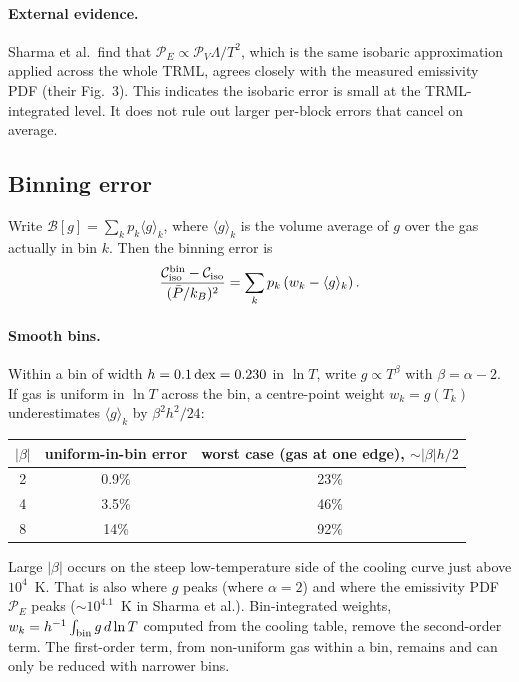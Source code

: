 \documentclass[11pt]{article}
\newcommand{\B}{\mathcal{B}}
\newcommand{\Ciso}{\mathcal{C}_{\rm iso}}
\newcommand{\Cbin}{\mathcal{C}_{\rm iso}^{\rm bin}}
\begin{document}
\paragraph{External evidence.} Sharma et al.\ find that $\mathcal P_E\propto\mathcal P_V\Lambda/T^2$, which is the same isobaric approximation applied across the whole TRML, agrees closely with the measured emissivity PDF (their Fig.~3). This indicates the isobaric error is small at the TRML-integrated level. It does not rule out larger per-block errors that cancel on average.

\subsection{Binning error}

Write $\B[g]=\sum_kp_k\langle g\rangle_k$, where $\langle g\rangle_k$ is the volume average of $g$ over the gas actually in bin $k$. Then the binning error is
\begin{equation}
\frac{\Cbin-\Ciso}{(\bar P/k_B)^2}=\sum_k p_k\left(w_k-\langle g\rangle_k\right).
\end{equation}

\paragraph{Smooth bins.} Within a bin of width $h=0.1\,{\rm dex}=0.230$ in $\ln T$, write $g\propto T^{\beta}$ with $\beta=\alpha-2$. If gas is uniform in $\ln T$ across the bin, a centre-point weight $w_k=g(T_k)$ underestimates $\langle g\rangle_k$ by $\beta^2h^2/24$:

\begin{center}
\begin{tabular}{ccc}
\toprule
$|\beta|$ & uniform-in-bin error & worst case (gas at one edge), $\sim|\beta|h/2$\\
\midrule
2 & 0.9\% & 23\%\\
4 & 3.5\% & 46\%\\
8 & 14\% & 92\%\\
\bottomrule
\end{tabular}
\end{center}

Large $|\beta|$ occurs on the steep low-temperature side of the cooling curve just above $10^4$~K. That is also where $g$ peaks (where $\alpha=2$) and where the emissivity PDF $\mathcal P_E$ peaks ($\sim10^{4.1}$~K in Sharma et al.). Bin-integrated weights, $w_k=h^{-1}\int_{\rm bin}g\,d\ln T$ computed from the cooling table, remove the second-order term. The first-order term, from non-uniform gas within a bin, remains and can only be reduced with narrower bins.
\end{document}
